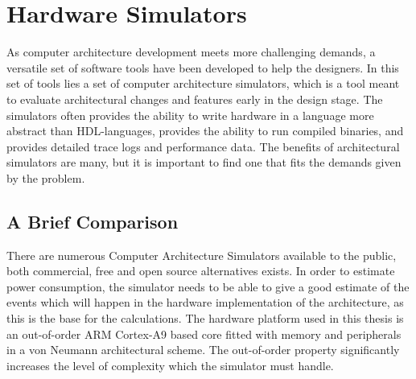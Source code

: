 \section{Hardware Simulators}

As computer architecture development meets more challenging demands, a versatile
set of software tools have been developed to help the designers. In this set of
tools lies a set of computer architecture simulators, which is a tool meant to
evaluate architectural changes and features early in the design stage. The
simulators often provides the ability to write hardware in a language more
abstract than HDL-languages, provides the ability to run compiled binaries, and
provides detailed trace logs and performance data. The benefits of architectural
simulators are many, but it is important to find one that fits the demands
given by the problem.

\subsection{A Brief Comparison}
\label{subsec:simulators}
There are numerous Computer Architecture Simulators available to the public,
both commercial, free and open source alternatives exists. In order to estimate
power consumption, the simulator needs to be able to give a good estimate of the
events which will happen in the hardware implementation of the architecture, as
this is the base for the calculations. The hardware platform used in this thesis
is an out-of-order ARM Cortex-A9 based core fitted with memory and
peripherals in a von Neumann architectural scheme. The out-of-order property
significantly increases the level of complexity which the simulator must handle.

